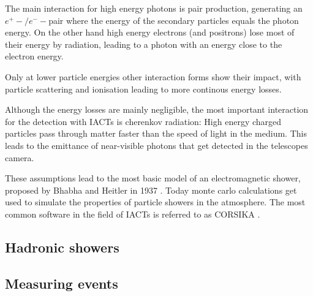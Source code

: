 The main interaction for high energy photons is pair 
production, generating an $e^+-/e^--$pair where the energy of 
the secondary particles equals the photon energy.
On the other hand high energy electrons (and positrons) lose 
most of their energy by radiation, leading to a photon with 
an energy close to the electron energy.

Only at lower particle energies other interaction forms show their impact,
with particle scattering and ionisation 
leading to more continous energy losses.

Although the energy losses are mainly negligible, 
the most important interaction for the detection with IACTs is 
cherenkov radiation: High energy charged particles pass through 
matter faster than the speed of light in the medium. This leads
to the emittance of near-visible photons that get detected 
in the telescopes camera. 

These assumptions lead to the most basic model of an 
electromagnetic shower, proposed by Bhabha and Heitler in 1937
\cite{doi:10.1098/rspa.1937.0082}.
Today monte carlo calculations get used to simulate the properties 
of particle showers in the atmosphere.
The most common software in the field of IACTs is referred to as
CORSIKA \cite{Engel:2018akg}.


\subsection{Hadronic showers}

\subsection{Measuring events}
